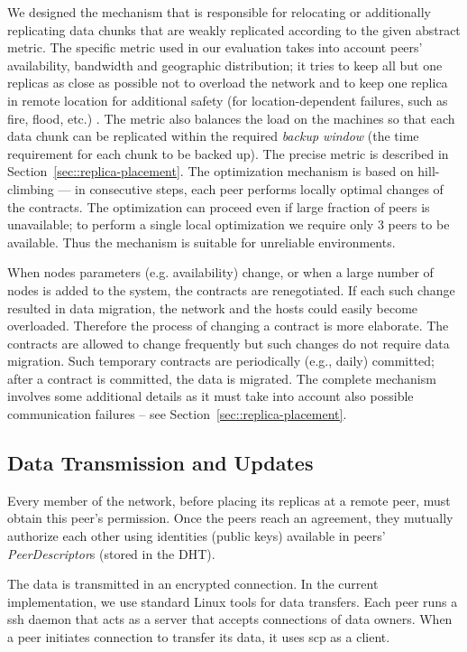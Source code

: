 \documentclass[10pt, final, conference, letterpaper]{IEEEtran}
\begin{document}
We designed the mechanism that is responsible for relocating or additionally replicating data chunks that are weakly replicated according to the given abstract metric. The specific metric used in our evaluation takes into account peers' availability, bandwidth and geographic distribution; it tries to keep all but one replicas as close as possible not to overload the network and to keep one replica in remote location for additional safety (for location-dependent failures, such as fire, flood, etc.) . The metric also balances the load on the machines so that each data chunk can be replicated within the required \emph{backup window} (the time requirement for each chunk to be backed up). The precise metric is described in Section~\ref{sec::replica-placement}. The optimization mechanism is based on hill-climbing --- in consecutive steps, each peer performs locally optimal changes of the contracts.
The optimization can proceed even if large fraction of peers is unavailable; to perform a single local optimization we require only 3 peers to be available. Thus the mechanism is suitable for unreliable environments.

When nodes parameters (e.g. availability) change, or when a large number of nodes is added to the system, the contracts are renegotiated.
If each such change resulted in data migration, the network and the hosts could easily become overloaded. Therefore the process of changing a contract is more elaborate.
The contracts are allowed to change frequently but such changes do not require data migration. Such temporary contracts are periodically (e.g., daily) committed; after a contract is committed, the data is migrated. The complete mechanism involves some additional details as it must take into account also possible communication failures -- see Section~\ref{sec::replica-placement}.

\subsection{Data Transmission and Updates}\label{sec::dataTransmission}
Every member of the network, before placing its replicas at a remote peer, must obtain this peer's permission. 
Once the peers reach an agreement, they mutually authorize each other using identities (public keys) available in peers' \emph{PeerDescriptor}s (stored in the DHT). 

The data is transmitted in an encrypted connection. 
In the current implementation, we use standard Linux tools for data transfers. Each peer runs a ssh daemon that acts as a server that accepts connections of data owners. When a peer initiates connection to transfer its data, it uses scp as a client.
\end{document}
